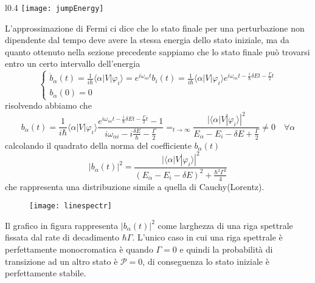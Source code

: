 \begin{wrapfigure}{l}{0.4\textwidth}
    \centering
    \texttt{[image: jumpEnergy]} %
\end{wrapfigure}
L'approssimazione di Fermi ci dice che lo stato finale per una perturbazione non dipendente dal tempo deve avere la stessa energia dello stato iniziale, ma da quanto ottenuto nella sezione precedente sappiamo che lo stato finale pu\`o trovarsi entro un certo intervallo dell'energia
\begin{equation*}
	\left \{ \begin{array}{l}
		\dot{b}_{\alpha}(t)  = \frac{1}{i\hbar}\langle \alpha|V|\varphi_i \rangle = e^{i \omega_{\alpha i}t}b_i(t) = \frac{1}{i \hbar}\langle \alpha |V|\varphi_i \rangle e^{i \omega_{\alpha i}t - \frac{i}{\hbar}\delta E t-\frac{\Gamma}{2}t} \\[0.5cm]
		b_{\alpha}(0) = 0
	\end{array}\right.
\end{equation*}
risolvendo abbiamo che 
\begin{equation*}
	b_{\alpha}(t) = \frac{1}{i \hbar} \langle \alpha|V|\varphi_i \rangle \frac{e^{i \omega_{i \alpha}t - \frac{i}{\hbar}\delta E t-\frac{\Gamma}{2}t}-1}{i\omega_{\alpha i} -i\frac{\delta E}{\hbar}-\frac{\Gamma}{2}} =_{t \to \infty} \frac{|\langle \alpha|V|\varphi_i \rangle|^2}{E_{\alpha}-E_{i} -\delta E+ \frac{\Gamma}{2}} \neq 0 \quad \forall \alpha
\end{equation*} 
calcolando il quadrato della norma del coefficiente $b_{\alpha}(t)$
\begin{equation*}
	|b_{\alpha}(t)|^2 = \frac{|\langle \alpha |V|\varphi_i\rangle|^2}{(E_{\alpha}-E_i-\delta E)^2+\frac{\hbar^2\Gamma^2}{4}}
\end{equation*}
che rappresenta una distribuzione simile a quella di Cauchy(Lorentz).
 
\begin{figure}[!ht]
\vspace{0.1in}
\texttt{[image: linespectr]}	
\centering
\end{figure}
Il grafico in figura rappresenta $|b_{\alpha}(t)|^2$ come larghezza di una riga spettrale fissata dal rate di decadimento $\hbar \Gamma$. L'unico caso in cui una riga spettrale \`e perfettamente monocromatica \`e quando $\Gamma =0$ e quindi la probabilit\`a di transizione ad un altro stato \`e $\mathcal{P} = 0$, di conseguenza lo stato iniziale \`e perfettamente stabile.

\newpage

